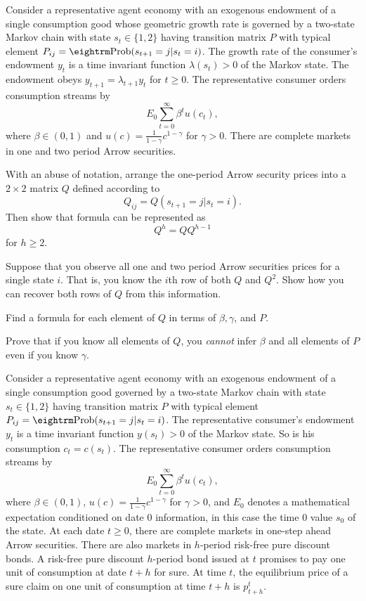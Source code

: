  
\medskip
\noindent Consider a representative agent economy with an exogenous endowment of a single consumption good whose geometric growth rate is
governed by  a two-state Markov chain
with state $s_t \in \{ 1, 2\}$ having transition  matrix $P$ with typical element $P_{ij} = {\rm Prob} (s_{t+1} = j | s_t = i)$.
The growth rate of the consumer's endowment $y_t$ is a time invariant function  $\lambda(s_t)> 0$ of the Markov state.
The endowment obeys $y_{t+1} = \lambda_{t+1} y_t$ for $t \geq 0$.
The representative consumer orders consumption streams by
$$ E_0 \sum_{t=0}^\infty \beta^t u(c_t), $$
where $\beta \in (0,1)$ and $u(c)= {\frac{1}{1-\gamma}}c^{1-\gamma}$ for $\gamma > 0$.
There are complete markets in one and two period Arrow securities.


\medskip
{} With an abuse of notation, arrange the one-period Arrow security prices into a $2 \times 2$ matrix $Q$ defined
according to
$$ Q_{ij} = Q(s_{t+1} = j| s_t = i). $$
Then show that formula  can be represented as
$$ Q^h = Q Q^{h-1} $$
for $h \geq 2$.


\medskip
{}  Suppose that you observe all one and two period  Arrow securities prices for a single state $i$.  That is,
you know the $i$th row of both $Q$ and $Q^2$.  Show how you can recover both rows of $Q$ from this information.


\medskip
{}  Find a formula for each element of $Q$  in terms of $\beta, \gamma$, and $P$.

\medskip
{}   Prove that if you  know all elements of $Q$, you {\it cannot} infer $\beta$ and all elements of $P$ even if you know  $\gamma$.


\medskip

 
\medskip
\noindent Consider a representative agent economy with an exogenous endowment of a single consumption good governed by a two-state Markov chain
with state $s_t \in \{ 1, 2\}$ having transition  matrix $P$ with typical element $P_{ij} = {\rm Prob} (s_{t+1} = j | s_t = i)$.
The representative consumer's endowment $y_t$ is a time invariant function  $y(s_t)> 0$ of the Markov state. So is his consumption $c_t = c(s_t)$.
The representative consumer orders consumption streams by
$$ E_0 \sum_{t=0}^\infty \beta^t u(c_t), $$
where $\beta \in (0,1)$,  $u(c)= {\frac{1}{1-\gamma}}c^{1-\gamma}$ for $\gamma > 0$, and $E_0$ denotes a mathematical expectation conditioned on date
$0$ information, in this case the time $0$ value  $s_0$ of the state.
At each date $t \geq 0$, there are complete markets in one-step ahead Arrow securities.
There are also markets in $h$-period risk-free pure discount  bonds.  A risk-free pure discount $h$-period bond issued at $t$ promises to pay one unit of
consumption at date $t+h$ for sure.  At time $t$, the equilibrium price of a sure claim on one unit of  consumption
at time $t+h$ is $p^t_{t+h}$.

